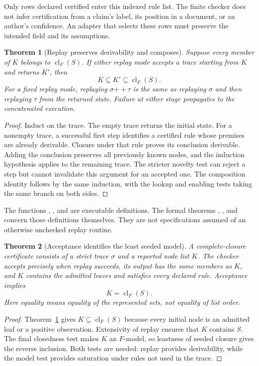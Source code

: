 \documentclass[11pt,oneside]{article}
\theoremstyle{komorebiplain}
\newtheorem{theorem}{Theorem}[section]
\theoremstyle{komorebidefinition}
\theoremstyle{komorebiremark}
\begin{document}
Only rows declared certified enter this indexed rule list. The finite checker does not infer certification from a claim's label, its position in a document, or an author's confidence. An adapter that selects these rows must preserve the intended field and its assumptions.

\begin{theorem}[Replay preserves derivability and composes]
\label{res:trace:replay}
Suppose every member of $K$ belongs to $\operatorname{cl}_F(S)$. If either replay mode accepts a trace starting from $K$ and returns $K'$, then
\[
 K\subseteq K'\subseteq\operatorname{cl}_F(S).
\]
For a fixed replay mode, replaying $\sigma\mathbin{+\!+}\tau$ is the same as replaying $\sigma$ and then replaying $\tau$ from the returned state. Failure at either stage propagates to the concatenated execution.
\end{theorem}
\begin{proof}
Induct on the trace. The empty trace returns the initial state. For a nonempty trace, a successful first step identifies a certified rule whose premises are already derivable. Closure under that rule proves its conclusion derivable. Adding the conclusion preserves all previously known nodes, and the induction hypothesis applies to the remaining trace. The stricter novelty test can reject a step but cannot invalidate this argument for an accepted one. The composition identity follows by the same induction, with the lookup and enabling tests taking the same branch on both sides.
\end{proof}

The functions , , and  are executable definitions. The formal theorems , , and  concern those definitions themselves. They are not specifications assumed of an otherwise unchecked replay routine.

\begin{theorem}[Acceptance identifies the least seeded model]
\label{res:trace:least}
A complete-closure certificate consists of a strict trace $\sigma$ and a reported node list $K$. The checker accepts precisely when replay succeeds, its output has the same members as $K$, and $K$ contains the admitted leaves and satisfies every declared rule. Acceptance implies
\[
 \boxed{K=\operatorname{cl}_F(S).}
\]
Here equality means equality of the represented sets, not equality of list order.
\end{theorem}
\begin{proof}
Theorem~\ref{res:trace:replay} gives $K\subseteq\operatorname{cl}_F(S)$ because every initial node is an admitted leaf or a positive observation. Extensivity of replay ensures that $K$ contains $S$. The final closedness test makes $K$ an $F$-model, so leastness of seeded closure gives the reverse inclusion. Both tests are needed: replay provides derivability, while the model test provides saturation under rules not used in the trace.
\end{proof}
\end{document}

